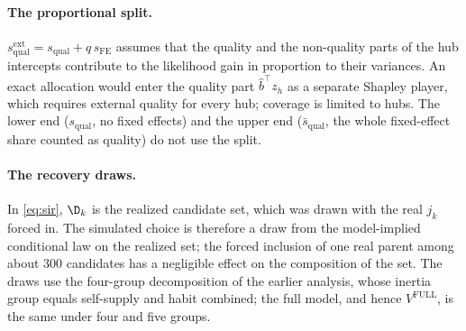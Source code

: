\paragraph{The proportional split.}
$s^{\mathrm{ext}}_{\mathrm{qual}} = s_{\mathrm{qual}} + q\, s_{\mathrm{FE}}$ assumes that the quality and the
non-quality parts of the hub intercepts contribute to the likelihood gain in proportion to their variances. An exact
allocation would enter the quality part $\hat b^\top z_h$ as a separate Shapley player, which requires external
quality for every hub; coverage is limited to \extHubs{} hubs. The lower end ($s_{\mathrm{qual}}$, no fixed effects)
and the upper end ($\bar s_{\mathrm{qual}}$, the whole fixed-effect share counted as quality) do not use the split.

\paragraph{The recovery draws.}
In \eqref{eq:sir}, $\D_k$ is the realized candidate set, which was drawn with the real $j_k$ forced in. The
simulated choice is therefore a draw from the model-implied conditional law on the realized set; the forced
inclusion of one real parent among about 300 candidates has a negligible effect on the composition of the set.
The draws use the four-group decomposition of the earlier analysis, whose inertia group equals self-supply and habit
combined; the full model, and hence $V^{\mathrm{FULL}}$, is the same under four and five groups.
